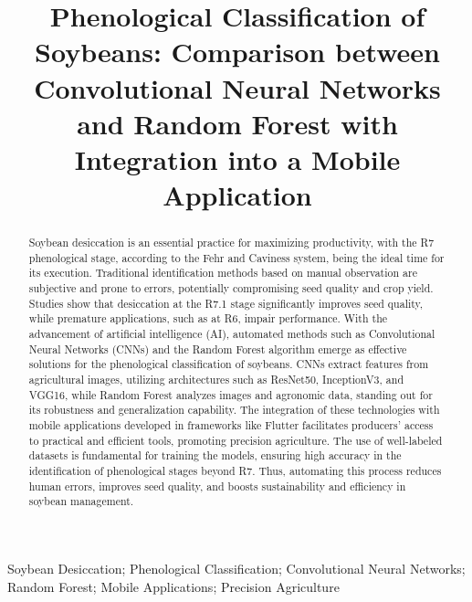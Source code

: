 \documentclass[12pt]{article}
\title{Phenological Classification of Soybeans:  Comparison between Convolutional Neural Networks and Random Forest with Integration into a Mobile Application }
\begin{document}
 
 
\maketitle

\begin{abstract}Soybean desiccation is an essential practice for maximizing productivity, with the R7 phenological stage, according to the Fehr and Caviness system, being the ideal time for its execution. \cite{fehr1977stages} Traditional identification methods based on manual observation are subjective and prone to errors, potentially compromising seed quality and crop yield. Studies show that desiccation at the R7.1 stage significantly improves seed quality, while premature applications, such as at R6, impair performance. With the advancement of artificial intelligence (AI), automated methods such as Convolutional Neural Networks (CNNs) and the Random Forest algorithm emerge as effective solutions for the phenological classification of soybeans. CNNs extract features from agricultural images, utilizing architectures such as ResNet50, InceptionV3, and VGG16, while Random Forest analyzes images and agronomic data, standing out for its robustness and generalization capability. The integration of these technologies with mobile applications developed in frameworks like Flutter facilitates producers' access to practical and efficient tools, promoting precision agriculture. The use of well-labeled datasets is fundamental for training the models, ensuring high accuracy in the identification of phenological stages beyond R7. Thus, automating this process reduces human errors, improves seed quality, and boosts sustainability and efficiency in soybean management. \end{abstract}

\renewcommand{\IEEEkeywordsname}{Keywords}
\begin{IEEEkeywords}
Soybean Desiccation; Phenological Classification; Convolutional Neural Networks; Random Forest; Mobile Applications; Precision Agriculture
\end{IEEEkeywords}
\IEEEpeerreviewmaketitle
\end{document}
